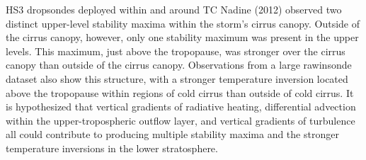 HS3 dropsondes deployed within and around TC Nadine (2012) observed two distinct upper-level stability maxima within the storm's cirrus canopy.
Outside of the cirrus canopy, however, only one stability maximum was present in the upper levels.
This maximum, just above the tropopause, was stronger over the cirrus canopy than outside of the cirrus canopy.
Observations from a large rawinsonde dataset also show this structure, with a stronger temperature inversion located above the tropopause within regions of cold cirrus than outside of cold cirrus. 
It is hypothesized that vertical gradients of radiative heating, differential advection within the upper-tropospheric outflow layer, and vertical gradients of turbulence all could contribute to producing multiple stability maxima and the stronger temperature inversions in the lower stratosphere.
